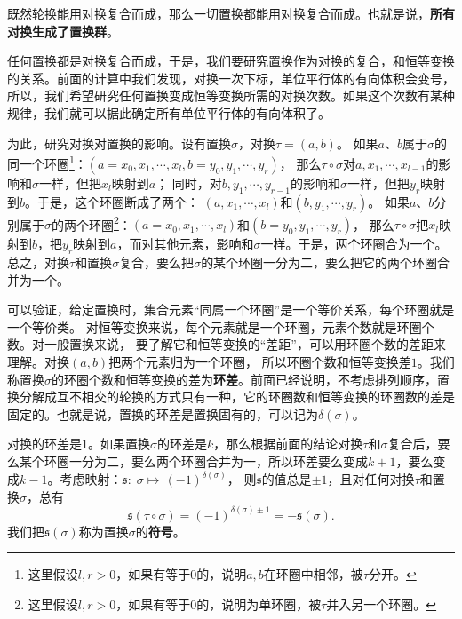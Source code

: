 \documentclass[12pt,UTF8,fontset=none]{ctexbook}
\begin{document}
既然轮换能用对换复合而成，那么一切置换都能用对换复合而成。也就是说，\textbf{所有对换生成了置换群}。

任何置换都是对换复合而成，于是，我们要研究置换作为对换的复合，和恒等变换的关系。前面的计算中我们发现，对换一次下标，单位平行体的有向体积会变号，所以，我们希望研究任何置换变成恒等变换所需的对换次数。如果这个次数有某种规律，我们就可以据此确定所有单位平行体的有向体积了。

为此，研究对换对置换的影响。设有置换$\sigma$，对换$\tau = (a, b)$。
如果$a$、$b$属于$\sigma$的同一个环圈\footnote{这里假设$l,r>0$，如果有等于$0$的，说明$a,b$在环圈中相邻，被$\tau$分开。}：$(a=x_0, x_1, \cdots, x_l, b=y_0, y_1, \cdots, y_r)$，
那么$\tau\circ\sigma$对$a,x_1, \cdots, x_{l-1}$的影响和$\sigma$一样，但把$x_l$映射到$a$；
同时，对$b,  y_1, \cdots, y_{r-1}$的影响和$\sigma$一样，但把$y_r$映射到$b$。于是，这个环圈断成了两个：
$(a, x_1, \cdots, x_l)$和$(b, y_1, \cdots, y_r)$。
如果$a$、$b$分别属于$\sigma$的两个环圈\footnote{这里假设$l,r>0$，如果有等于$0$的，说明为单环圈，被$\tau$并入另一个环圈。}：$(a=x_0, x_1, \cdots, x_l)$和$(b=y_0, y_1, \cdots, y_r)$，
那么$\tau\circ\sigma$把$x_l$映射到$b$，把$y_r$映射到$a$，而对其他元素，影响和$\sigma$一样。于是，两个环圈合为一个。
总之，对换$\tau$和置换$\sigma$复合，要么把$\sigma$的某个环圈一分为二，要么把它的两个环圈合并为一个。

可以验证，给定置换时，集合元素“同属一个环圈”是一个等价关系，每个环圈就是一个等价类。
对恒等变换来说，每个元素就是一个环圈，元素个数就是环圈个数。对一般置换来说，
要了解它和恒等变换的“差距”，可以用环圈个数的差距来理解。对换$(a, b)$把两个元素归为一个环圈，
所以环圈个数和恒等变换差$1$。我们称置换$\sigma$的环圈个数和恒等变换的差为\textbf{环差}。前面已经说明，不考虑排列顺序，置换分解成互不相交的轮换的方式只有一种，它的环圈数和恒等变换的环圈数的差是固定的。也就是说，置换的环差是置换固有的，可以记为$\delta(\sigma)$。

对换的环差是$1$。如果置换$\sigma$的环差是$k$，那么根据前面的结论对换$\tau$和$\sigma$复合后，要么某个环圈一分为二，要么两个环圈合并为一，所以环差要么变成$k+1$，要么变成$k-1$。考虑映射：$\mathfrak{s}:\;\sigma \mapsto\, (-1)^{\delta(\sigma)}$，
则$\mathfrak{s}$的值总是$\pm 1$，且对任何对换$\tau$和置换$\sigma$，总有
$$\mathfrak{s}(\tau\circ\sigma) = (-1)^{\delta(\sigma)\pm 1} = -\mathfrak{s}(\sigma).$$
我们把$\mathfrak{s}(\sigma)$称为置换$\sigma$的\textbf{符号}。
\end{document}
